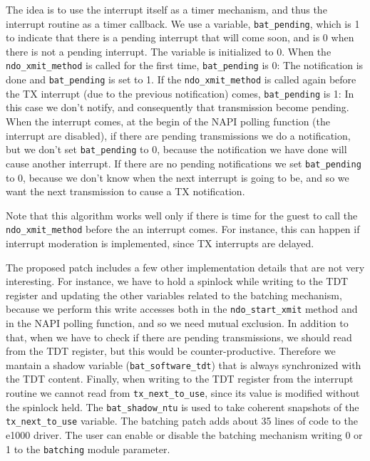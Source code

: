 The idea is to use the interrupt itself as a timer mechanism, and thus the interrupt routine as a timer callback.
We use a variable, \texttt{bat\_pending}, which is 1 to indicate that there is a pending interrupt that will come soon, and is
0 when there is not a pending interrupt. The variable is initialized to 0.
When the \texttt{ndo\_xmit\_method} is called for the first time, \texttt{bat\_pending} is 0: The notification is done and 
\texttt{bat\_pending} is set to 1.
If the \texttt{ndo\_xmit\_method} is called again before the TX interrupt (due to the previous notification) comes, \texttt{bat\_pending}
is 1: In this case we don't notify, and consequently that transmission become pending.
When the interrupt comes, at the begin of the NAPI polling function (the interrupt are disabled), if there are pending transmissions we do 
a notification, but we don't set \texttt{bat\_pending} to 0, because the notification we have done will cause another interrupt.
If there are no pending notifications we set \texttt{bat\_pending} to 0, because we don't know when the next interrupt is going to be, and
so we want the next transmission to cause a TX notification.

Note that this algorithm works well only if there is time for the guest to call the \texttt{ndo\_xmit\_method} before the an interrupt
comes. For instance, this can happen if interrupt moderation is implemented, since TX interrupts are delayed.

\vspace{0.5cm}

The proposed patch includes a few other implementation details that are not very interesting. For instance, we have to hold a spinlock
while writing to the TDT register and updating the other variables related to the batching mechanism, because we perform this write
accesses both in the \texttt{ndo\_start\_xmit} method and in the NAPI polling function, and so we need mutual exclusion.
In addition to that, when we have to check if there are pending transmissions, we should read from the TDT register, but this would be 
counter-productive. Therefore we mantain a shadow variable (\texttt{bat\_software\_tdt}) that is always synchronized with the TDT content.
Finally, when writing to the TDT register from the interrupt routine we cannot read from \texttt{tx\_next\_to\_use}, since its value
is modified without the spinlock held. The \texttt{bat\_shadow\_ntu} is used to take coherent snapshots of the \texttt{tx\_next\_to\_use}
variable.
The batching patch adds about 35 lines of code to the e1000 driver.
The user can enable or disable the batching mechanism writing 0 or 1 to the \texttt{batching} module parameter.


